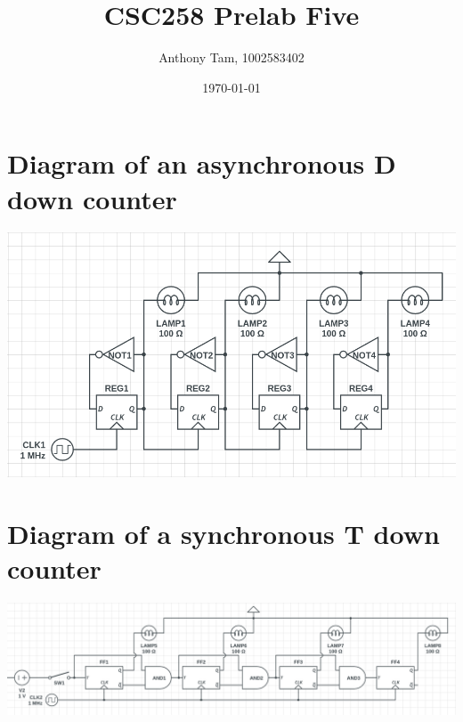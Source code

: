 \documentclass[11pt]{article}
\author{Anthony Tam, 1002583402}
\date{\today}
\title{CSC258 Prelab Five}
\begin{document}
\maketitle


\section{Diagram of an asynchronous D down counter}
\label{sec-1}
\includegraphics[width=\textwidth]{DDownCount.png}

\section{Diagram of a synchronous T down counter}
\label{sec-2}
\includegraphics[width=\textwidth]{TDownCount.png}
\end{document}
